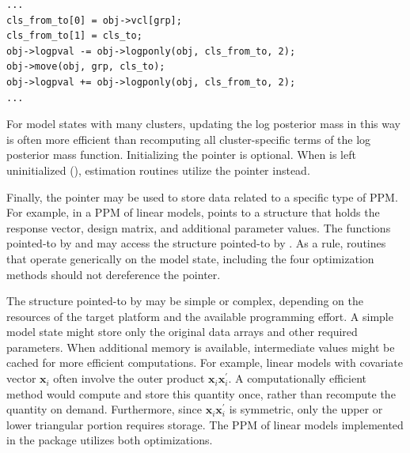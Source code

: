 \documentclass[article, nojss]{jss}
\newcommand{\bx}{\boldsymbol{x}}
\begin{document}
\begin{verbatim}
...
cls_from_to[0] = obj->vcl[grp];
cls_from_to[1] = cls_to;
obj->logpval -= obj->logponly(obj, cls_from_to, 2);
obj->move(obj, grp, cls_to);
obj->logpval += obj->logponly(obj, cls_from_to, 2);
...
\end{verbatim}

For model states with many clusters, updating the log posterior mass in this way is often more efficient than recomputing all cluster-specific terms of the log posterior mass function. Initializing the  pointer is optional. When  is left uninitialized (), estimation routines utilize the  pointer instead.

Finally, the  pointer may be used to store data related to a specific type of PPM. For example, in a PPM of linear models,  points to a structure that holds the response vector, design matrix, and additional parameter values. The functions pointed-to by  and  may access the structure pointed-to by . As a rule, routines that operate generically on the model state, including the four optimization methods should not dereference the  pointer. 
 
The structure pointed-to by  may be simple or complex, depending on the resources of the target platform and the available programming effort. A simple model state might store only the original data arrays and other required parameters. When additional memory is available, intermediate values might be cached for more efficient computations. For example, linear models with covariate vector $\bx_i$ often involve the outer product $\bx_i\bx_i^{\prime}$. A computationally efficient method would compute and store this quantity once, rather than recompute the quantity on demand. Furthermore, since $\bx_i\bx_i^{\prime}$ is symmetric, only the upper or lower triangular portion requires storage. The PPM of linear models implemented in the  package utilizes both optimizations.
\end{document}
